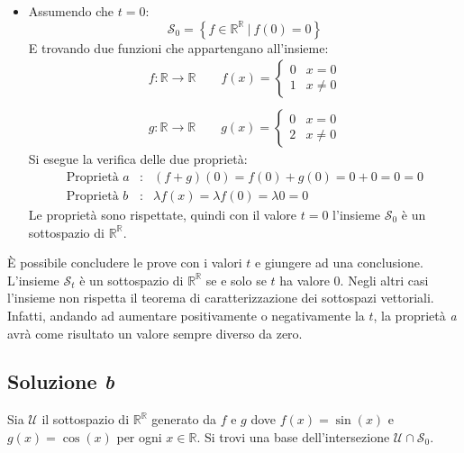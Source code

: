 \documentclass[a4paper]{article}
\begin{document}
\begin{itemize}
		\item Assumendo che $t = 0$:
		\begin{equation*}
			\mathscr{S}_{0} = \left\{f \in \mathbb{R^{R}} \: | \: f\left(0\right) = 0\right\}
		\end{equation*}
		E trovando due funzioni che appartengano all'insieme:
		\begin{gather*}
			f : \mathbb{R} \rightarrow \mathbb{R} \hspace{2em} f\left(x\right) = \begin{cases}
				0 & x = 0 \\
				1 & x \ne 0
			\end{cases} \\
			\\
			g : \mathbb{R} \rightarrow \mathbb{R} \hspace{2em} g\left(x\right) = \begin{cases}
				0 & x = 0 \\
				2 & x \ne 0
			\end{cases}
		\end{gather*}
		Si esegue la verifica delle due proprietà:
		\begin{equation*}
			\begin{array}{lll}
				\text{Proprietà }a & : & \left(f + g\right)\left(0\right) = f\left(0\right) + g\left(0\right) = 0+0 = 0 = 0 \\ [0.5em]
				\text{Proprietà }b & : & \lambda f\left(x\right) = \lambda f\left(0\right) = \lambda 0 = 0
			\end{array}
		\end{equation*}
		Le proprietà sono rispettate, quindi con il valore $t = 0$ l'insieme $\mathscr{S}_{0}$ è un sottospazio di $\mathbb{R^{R}}$.
	\end{itemize}
	È possibile concludere le prove con i valori $t$ e giungere ad una conclusione. L'insieme $\mathscr{S}_{t}$ è un sottospazio di $\mathbb{R^{R}}$ se e solo se $t$ ha valore $0$. Negli altri casi l'insieme non rispetta il teorema di caratterizzazione dei sottospazi vettoriali. Infatti, andando ad aumentare positivamente o negativamente la $t$, la proprietà \emph{a} avrà come risultato un valore sempre diverso da zero.
	
	\subsection{Soluzione \emph{b}}
	
	Sia $\mathscr{U}$ il sottospazio di $\mathbb{R^{R}}$ generato da $f$ e $g$ dove $f\left(x\right) = \sin\left(x\right)$ e $g\left(x\right) = \cos\left(x\right)$ per ogni $x \in \mathbb{R}$. Si trovi una base dell'intersezione $\mathscr{U} \cap \mathscr{S}_{0}$.\newline
	
\end{document}
